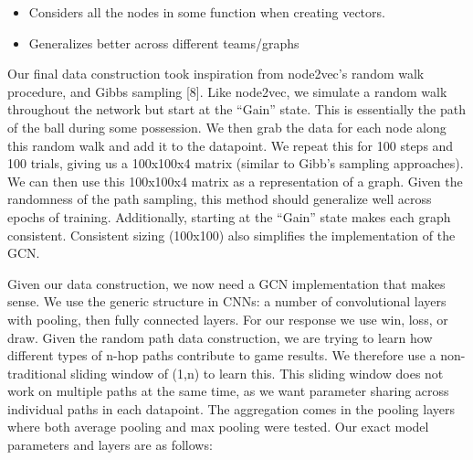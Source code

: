 \begin{itemize}
    \item Considers all the nodes in some function when creating vectors.

    \item Generalizes better across different teams/graphs 
\end{itemize}


Our final data construction took inspiration from node2vec's random walk procedure, and Gibbs sampling [8]. Like node2vec, we simulate a random walk throughout the network but start at the ``Gain'' state. This is essentially the path of the ball during some possession.  We then grab the data for each node along this random walk and add it to the datapoint. We repeat this for 100 steps and 100 trials, giving us a 100x100x4 matrix (similar to Gibb's sampling approaches). We can then use this 100x100x4 matrix as a representation of a graph. Given the randomness of the path sampling, this method should generalize well across epochs of training. Additionally, starting at the ``Gain'' state makes each graph consistent. Consistent sizing (100x100) also simplifies the implementation of the GCN. 

Given our data construction, we now need a GCN implementation that makes sense. We use the generic structure in CNNs: a number of convolutional layers with pooling, then fully connected layers. For our response we use win, loss, or draw. Given the random path data construction, we are trying to learn how different types of n-hop paths contribute to game results. We therefore use a non-traditional sliding window of (1,n) to learn this. This sliding window does not work on multiple paths at the same time, as we want parameter sharing across individual paths in each datapoint. The aggregation comes in the pooling layers where both average pooling and max pooling were tested. Our exact model parameters and layers are as follows: 


